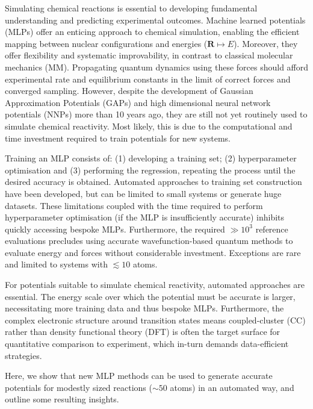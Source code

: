 \documentclass[twoside,twocolumn,9pt]{article}
\begin{document}
Simulating chemical reactions is essential to developing fundamental understanding and predicting experimental outcomes.\cite{Orr-Ewing2017} Machine learned potentials (MLPs) offer an enticing approach to chemical simulation, enabling the efficient mapping between nuclear configurations and energies ($\boldsymbol{R} \mapsto E$). Moreover, they offer flexibility and systematic improvability, in contrast to classical molecular mechanics (MM).\cite{Behler2016} Propagating quantum dynamics using these forces should afford experimental rate and equilibrium constants in the limit of correct forces and converged sampling. However, despite the development of Gaussian Approximation Potentials (GAPs)\cite{Bartk2010, Deringer2021} and high dimensional neural network potentials (NNPs)\cite{Behler2007} more than 10 years ago, they are still not yet routinely used to simulate chemical reactivity.\cite{Ko2020} Most likely, this is due to the computational and time investment required to train potentials for new systems. 

Training an MLP consists of: (1) developing a training set; (2) hyperparameter optimisation and (3) performing the regression, repeating the process until the desired accuracy is obtained. Automated approaches to training set construction have been developed,\cite{Smith2018, Young2021gap, Miksch2021} but can be limited to small systems or generate huge datasets. These limitations coupled with the time required to perform hyperparameter optimisation (if the MLP is insufficiently accurate) inhibits quickly accessing bespoke MLPs. Furthermore, the required $\gg10^3$ reference evaluations precludes using accurate wavefunction-based quantum methods to evaluate energy and forces without considerable investment.\cite{Smith2019} Exceptions are rare and limited to systems with $\lesssim 10$ atoms.\cite{Young2021gap, Dral2020}

For potentials suitable to simulate chemical reactivity, automated approaches are essential. The energy scale over which the potential must be accurate is larger, necessitating more training data and thus bespoke MLPs. Furthermore, the complex electronic structure around transition states means coupled-cluster (CC) rather than density functional theory (DFT) is often the target surface for quantitative comparison to experiment,\cite{Zhao2005} which in-turn demands data-efficient strategies. 

Here, we show that new MLP methods\cite{Batzner2021, Kovacs2021} can be used to generate accurate potentials for modestly sized reactions ($\sim50$ atoms) in an automated way, and outline some resulting insights. 
\end{document}
